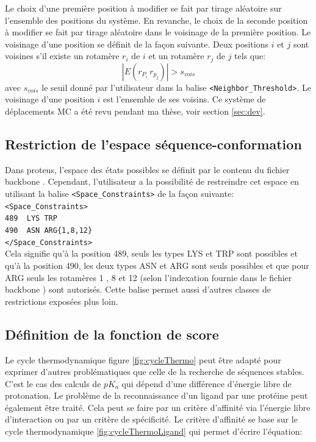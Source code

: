 Le choix d'une première position à modifier se fait par tirage aléatoire sur l'ensemble des positions du système. En revanche, le choix de la seconde position à modifier se fait par tirage aléatoire dans le voisinage de la première position. Le voisinage d'une position se définit de la façon suivante. Deux positions $i$ et $j$ sont voisines s'il existe un rotamère $r_i$ de $i$ et un rotamère $r_j$ de $j$ tels que:
\begin{displaymath}
  \label{eq:voisin}
 | E(r_{P_i}_,r_{p_j}) | > s_{vois}
\end{displaymath} 
avec $s_{vois}$ le seuil donné par l'utilisateur dans la balise \verb!<Neighbor_Threshold>!. Le voisinage d'une position $i$ est l'ensemble de ses voisins. Ce système de déplacements MC a été revu pendant ma thèse, voir section \vref{sec:dev}.

\subsection{Restriction de l'espace séquence-conformation}
\label{sub:restric}
Dans proteus, l'espace des états possibles se définit par le contenu du fichier \og backbone \fg. Cependant, l'utilisateur a la possibilité de restreindre cet espace en utilisant la balise \verb!<Space_Constraints>! de la façon suivante:\\
\verb!<Space_Constraints>! \\
\verb!489  LYS TRP! \\
\verb!490  ASN ARG{1,8,12}! \\
\verb!</Space_Constraints>! \\
Cela signifie qu'à la position 489, seuls les types LYS et TRP sont possibles et qu'à la position 490, les deux types ASN et ARG sont seuls possibles et que pour ARG seuls les rotamères 1 , 8  et 12 (selon l'indexation fournie dans le fichier \og backbone \fg) sont autorisés. Cette balise permet aussi d'autres classes de restrictions exposées plus loin.

\subsection{Définition de la fonction de score }

Le cycle thermodynamique figure \ref{fig:cycleThermo} peut être adapté pour exprimer d'autres problématiques que celle de la recherche de séquences stables. C'est le cas des calculs de $pK_a$ qui dépend d'une différence d'énergie libre de protonation. Le  problème de la reconnaissance d'un ligand par une protéine peut également être traité. Cela peut se faire par un critère d'affinité via l'énergie libre d'interaction ou par un critère de spécificité. Le critère d'affinité se base sur le cycle thermodynamique  \ref{fig:cycleThermoLigand} qui permet d'écrire l'équation:

